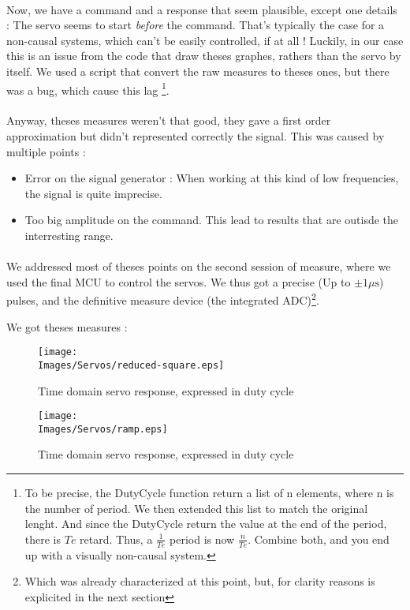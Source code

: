 \paragraph{}
Now, we have a command and a response that seem plausible, except one details : The servo seems to start 
\textit{before} the command. That's typically the case for a non-causal systems, which can't be easily controlled,
if at all !
Luckily, in our case this is an issue from the code that draw theses graphes, rathers than the servo by itself.
We used a script that convert the raw measures to theses ones, but there was a bug, which cause this lag \footnote{
    To be precise, the DutyCycle function return a list of n elements, where n is the number of period. We then
    extended this list to match the original lenght. And since the DutyCycle return the value at the end of the 
    period, there is $Te$ retard. Thus, a $\frac{1}{Te}$ period is now $\frac{n}{Te}$. 
    Combine both, and you end up with a visually non-causal system.
}.

\paragraph{}
Anyway, theses measures weren't that good, they gave a first order approximation but didn't represented 
correctly the signal. This was caused by multiple points :

\begin{itemize}
    \item Error on the signal generator : When working at this kind of low frequencies, the signal is quite imprecise.
    \item Too big amplitude on the command. This lead to results that are outisde the interresting range.
\end{itemize}

\paragraph{}
We addressed most of theses points on the second session of measure, where we used the final MCU to control the servos.
We thus got a precise (Up to $\pm 1 \si{\mu\second}$) pulses, and the definitive measure device (the integrated ADC)\footnote{
    Which was already characterized at this point, but, for clarity reasons is explicited in the next section
}.

We got theses measures :

\begin{figure}[!hbt]
    \centering
    \texttt{[image: \\Images/Servos/reduced-square.eps]}
    \caption{Time domain servo response, expressed in duty cycle}
\end{figure}
\begin{figure}[!hbt]
    \centering
    \texttt{[image: \\Images/Servos/ramp.eps]}
    \caption{Time domain servo response, expressed in duty cycle}
\end{figure}
\FloatBarrier

